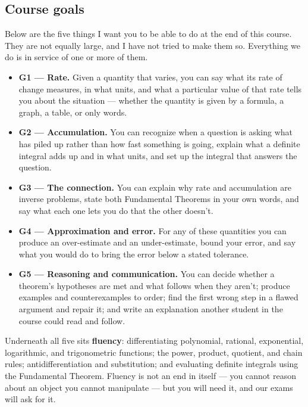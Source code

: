 \documentclass[11pt,twoside]{amsart}
\begin{document}
\subsection*{Course goals}
Below are the five things I want you to be able to do at the end of this course. They are not equally large, and I have not tried to make them so. Everything we do is in service of one or more of them.
\begin{itemize}
\item \textbf{G1 --- Rate.} Given a quantity that varies, you can say what its rate of change measures, in what units, and what a particular value of that rate tells you about the situation --- whether the quantity is given by a formula, a graph, a table, or only words.
\item \textbf{G2 --- Accumulation.} You can recognize when a question is asking what has piled up rather than how fast something is going, explain what a definite integral adds up and in what units, and set up the integral that answers the question.
\item \textbf{G3 --- The connection.} You can explain why rate and accumulation are inverse problems, state both Fundamental Theorems in your own words, and say what each one lets you do that the other doesn't.
\item \textbf{G4 --- Approximation and error.} For any of these quantities you can produce an over-estimate and an under-estimate, bound your error, and say what you would do to bring the error below a stated tolerance.
\item \textbf{G5 --- Reasoning and communication.} You can decide whether a theorem's hypotheses are met and what follows when they aren't; produce examples and counterexamples to order; find the first wrong step in a flawed argument and repair it; and write an explanation another student in the course could read and follow.
\end{itemize}
Underneath all five sits \textbf{fluency}: differentiating polynomial, rational, exponential, logarithmic, and trigonometric functions; the power, product, quotient, and chain rules; antidifferentiation and substitution; and evaluating definite integrals using the Fundamental Theorem. Fluency is not an end in itself --- you cannot reason about an object you cannot manipulate --- but you will need it, and our exams will ask for it.
\end{document}

